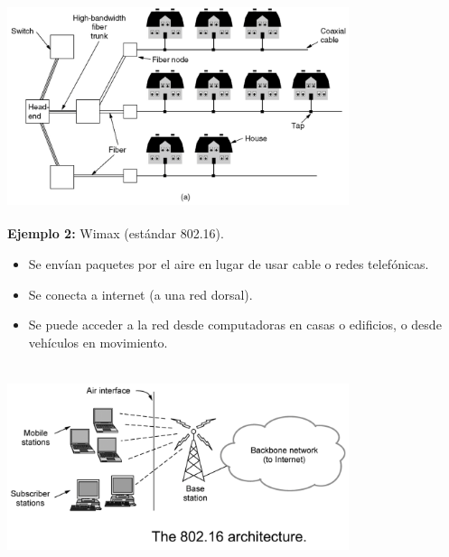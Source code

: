 \documentclass[10pt,a4paper]{report}
\begin{document}
	\begin{center}
		\includegraphics[width=10cm, height=6cm]{./imagenes/metropolitana1.png} 
	\end{center}

\textbf{Ejemplo 2:} Wimax (estándar 802.16).
	\begin{itemize}
		\item Se envían paquetes por el aire en lugar de usar cable o redes telefónicas.
		\item Se conecta a internet (a una red dorsal).
		\item Se puede acceder a la red desde computadoras en casas o edificios, o 
		desde vehículos en movimiento.
	\end{itemize}	 
	
	\begin{center}
		\includegraphics[width=10cm, height=6cm]{./imagenes/metropolitana2.png} 
	\end{center}
\end{document}
